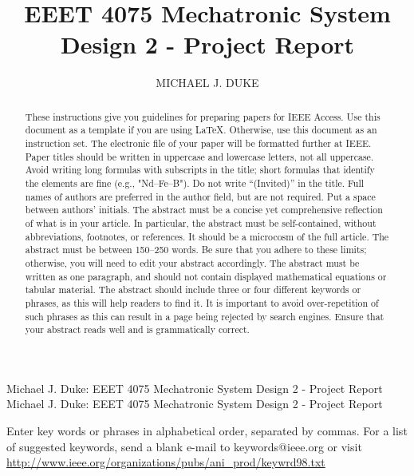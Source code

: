 \documentclass{ieeeaccess}
\begin{document}

\title{EEET 4075 Mechatronic System Design 2 - Project Report}
\author{\uppercase{Michael J. Duke}}
\address[1]{University of South Australia, Mawson Lakes, SA 5095 Australia (e-mail: dukmj002@mymail.unisa.edu.au)}

\markboth
{Michael J. Duke: EEET 4075 Mechatronic System Design 2 - Project Report}
{Michael J. Duke: EEET 4075 Mechatronic System Design 2 - Project Report}

\begin{abstract}
These instructions give you guidelines for preparing papers for 
IEEE Access. Use this document as a template if you are 
using \LaTeX. Otherwise, use this document as an 
instruction set. The electronic file of your paper will be formatted further 
at IEEE. Paper titles should be written in uppercase and lowercase letters, 
not all uppercase. Avoid writing long formulas with subscripts in the title; 
short formulas that identify the elements are fine (e.g., "Nd--Fe--B"). Do 
not write ``(Invited)'' in the title. Full names of authors are preferred in 
the author field, but are not required. Put a space between authors' 
initials. The abstract must be a concise yet comprehensive reflection of 
what is in your article. In particular, the abstract must be self-contained, 
without abbreviations, footnotes, or references. It should be a microcosm of 
the full article. The abstract must be between 150--250 words. Be sure that 
you adhere to these limits; otherwise, you will need to edit your abstract 
accordingly. The abstract must be written as one paragraph, and should not 
contain displayed mathematical equations or tabular material. The abstract 
should include three or four different keywords or phrases, as this will 
help readers to find it. It is important to avoid over-repetition of such 
phrases as this can result in a page being rejected by search engines. 
Ensure that your abstract reads well and is grammatically correct.
\end{abstract}

\begin{keywords}
Enter key words or phrases in alphabetical 
order, separated by commas. For a list of suggested keywords, send a blank 
e-mail to keywords@ieee.org or visit \underline
{http://www.ieee.org/organizations/pubs/ani\_prod/keywrd98.txt}
\end{keywords}
\end{document}
